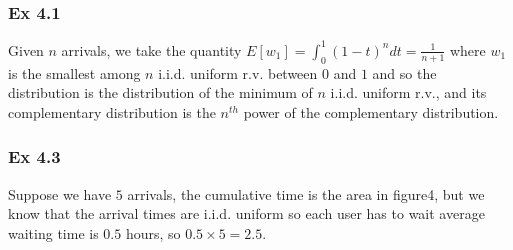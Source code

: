 \documentclass[a4paper, 12pt, openright]{book}
\theoremstyle{theoremdd}
\theoremstyle{remark}
\begin{document}
\subsubsection*{Ex 4.1}
Given $n$ arrivals, we take the quantity $E[w_1] = \int_{0}^{1}(1-t)^n dt = \frac{1}{n+1}$ where $w_1$ is the smallest among $n$ i.i.d. uniform r.v. between $0$ and $1$ and so the distribution is the distribution of the minimum of $n$ i.i.d. uniform r.v., and its complementary distribution is the $n^{th}$ power of the complementary distribution.\\
\subsubsection*{Ex 4.3}
Suppose we have $5$ arrivals, the cumulative time is the area in figure4, but we know that the arrival times are i.i.d. uniform so each user has to wait average waiting time is $0.5$ hours, so $0.5\times5 = 2.5$.\\
\end{document}
